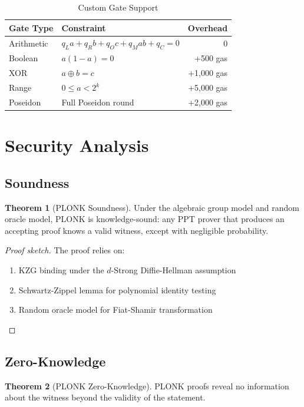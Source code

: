 \documentclass[11pt,a4paper]{article}
\theoremstyle{definition}
\newtheorem{theorem}{Theorem}
\begin{document}
\begin{table}[h]
\centering
\caption{Custom Gate Support}
\begin{tabular}{llr}
\toprule
Gate Type & Constraint & Overhead \\
\midrule
Arithmetic & $q_L a + q_R b + q_O c + q_M ab + q_C = 0$ & 0 \\
Boolean & $a(1-a) = 0$ & +500 gas \\
XOR & $a \oplus b = c$ & +1,000 gas \\
Range & $0 \leq a < 2^k$ & +5,000 gas \\
Poseidon & Full Poseidon round & +2,000 gas \\
\bottomrule
\end{tabular}
\end{table}

\section{Security Analysis}

\subsection{Soundness}

\begin{theorem}[PLONK Soundness]
    Under the algebraic group model and random oracle model, PLONK is knowledge-sound: any PPT prover that produces an accepting proof knows a valid witness, except with negligible probability.
\end{theorem}

\begin{proof}[Proof sketch]
    The proof relies on:
    \begin{enumerate}
        \item KZG binding under the $d$-Strong Diffie-Hellman assumption
        \item Schwartz-Zippel lemma for polynomial identity testing
        \item Random oracle model for Fiat-Shamir transformation
    \end{enumerate}
\end{proof}

\subsection{Zero-Knowledge}

\begin{theorem}[PLONK Zero-Knowledge]
    PLONK proofs reveal no information about the witness beyond the validity of the statement.
\end{theorem}
\end{document}
